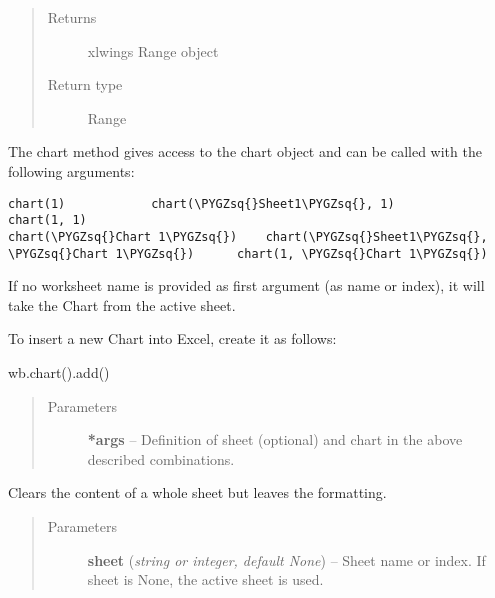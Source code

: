 \documentclass[letterpaper,11pt,english]{sphinxmanual}
\def\PYGZsq{\char`\'}
\begin{document}
\begin{fulllineitems}
\begin{fulllineitems}
\begin{quote}
\begin{description}
\begin{itemize}
\end{itemize}

\item[{Returns}] \leavevmode
xlwings Range object

\item[{Return type}] \leavevmode
Range

\end{description}\end{quote}

\end{fulllineitems}


\begin{fulllineitems}
\label{workbook:xlwings.Workbook.chart}
The chart method gives access to the chart object and can be called with the following arguments:

\begin{Verbatim}[commandchars=\\\{\}]
chart(1)            chart(\PYGZsq{}Sheet1\PYGZsq{}, 1)              chart(1, 1)
chart(\PYGZsq{}Chart 1\PYGZsq{})    chart(\PYGZsq{}Sheet1\PYGZsq{}, \PYGZsq{}Chart 1\PYGZsq{})      chart(1, \PYGZsq{}Chart 1\PYGZsq{})
\end{Verbatim}

If no worksheet name is provided as first argument (as name or index),
it will take the Chart from the active sheet.

To insert a new Chart into Excel, create it as follows:

wb.chart().add()
\begin{quote}\begin{description}
\item[{Parameters}] \leavevmode
\textbf{*args} -- 
Definition of sheet (optional) and chart in the above described combinations.


\end{description}\end{quote}

\end{fulllineitems}


\begin{fulllineitems}
\label{workbook:xlwings.Workbook.clear_contents}
Clears the content of a whole sheet but leaves the formatting.
\begin{quote}\begin{description}
\item[{Parameters}] \leavevmode
\textbf{sheet} (\emph{string or integer, default None}) -- Sheet name or index. If sheet is None, the active sheet is used.


\end{description}
\end{quote}
\end{fulllineitems}
\end{fulllineitems}
\end{document}
